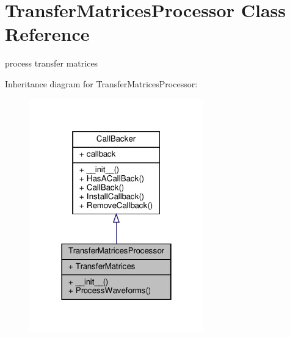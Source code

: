 \hypertarget{classSignalIntegrity_1_1TimeDomain_1_1Filters_1_1TransferMatricesProcessor_1_1TransferMatricesProcessor}{}\section{Transfer\+Matrices\+Processor Class Reference}
\label{classSignalIntegrity_1_1TimeDomain_1_1Filters_1_1TransferMatricesProcessor_1_1TransferMatricesProcessor}


process transfer matrices  




Inheritance diagram for Transfer\+Matrices\+Processor\+:\nopagebreak
\begin{figure}[H]
\begin{center}
\leavevmode
\includegraphics[width=214pt]{classSignalIntegrity_1_1TimeDomain_1_1Filters_1_1TransferMatricesProcessor_1_1TransferMatricesProcessor__inherit__graph}
\end{center}
\end{figure}



